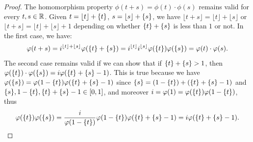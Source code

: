 \begin{proof}
The homomorphism property $\phi(t+s)=\phi(t)\cdot\phi(s)$ 
remains valid for every $t,s\in{\mathbb R}$.
Given $t=\lfloor t \rfloor +{\left\{ t \right\}}$, $s=\lfloor s \rfloor+{\left\{ s \right\}}$, we
have
$\lfloor t+s \rfloor=\lfloor t \rfloor + \lfloor s \rfloor$ 
or $\lfloor t+s \rfloor=\lfloor t \rfloor +\lfloor s \rfloor +1$ depending on
whether
${\left\{ t \right\}}+{\left\{ s \right\}}$ is less than $1$ or not.
In the first case, we have:
\[
\varphi(t+s) = i^{\lfloor t \rfloor +\lfloor s \rfloor}\varphi({\left\{ t \right\}}+{\left\{ s \right\}})
    = i^{\lfloor t \rfloor }i^{\lfloor s
  \rfloor}\varphi({\left\{ t \right\}})\varphi({\left\{ s \right\}})
  = \varphi(t)\cdot\varphi(s).
\]
The second case remains valid if we can show that 
if ${\left\{ t \right\}}+{\left\{ s \right\}}>1$, then 
$\varphi({\left\{ t \right\}})\cdot \varphi({\left\{ s \right\}}) = i\varphi({\left\{ t \right\}}+{\left\{ s \right\}}-1)$.
This is true because we have
$\varphi({\left\{ s \right\}})=\varphi(1-{\left\{ t \right\}})\varphi({\left\{ t \right\}}+{\left\{ s \right\}}-1)$ since 
${\left\{ s \right\}}=(1-{\left\{ t \right\}})+({\left\{ t \right\}}+{\left\{ s \right\}}-1)$ 
and ${\left\{ s \right\}},1-{\left\{ t \right\}},{\left\{ t \right\}}+{\left\{ s \right\}}-1\in[0,1]$,
and moreover $i=\varphi(1)=\varphi({\left\{ t \right\}})\varphi(1-{\left\{ t \right\}})$,
thus 
\[
\varphi({\left\{ t \right\}})\varphi({\left\{ s \right\}}) 
  = \frac{i}{\varphi(1-{\left\{ t \right\}})}\varphi(1-{\left\{ t \right\}})\varphi({\left\{ t \right\}}+{\left\{ s \right\}}-1)
  = i \varphi({\left\{ t \right\}}+{\left\{ s \right\}}-1).
\]
\end{proof}

